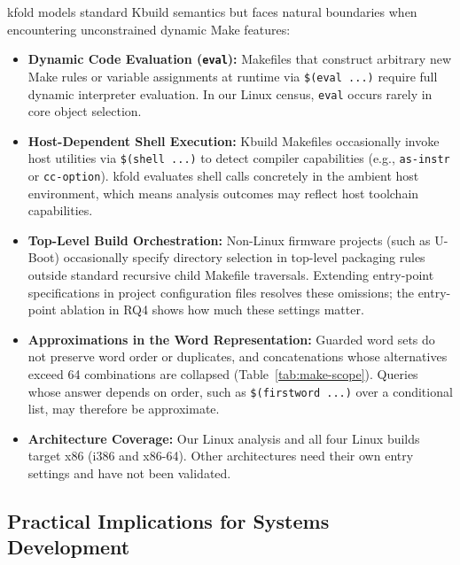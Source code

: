 \documentclass[acmsmall]{acmart}
\newcommand{\tool}{\textsf{kfold}\xspace}
\providecommand{\tightlist}{\setlength{\itemsep}{0pt}\setlength{\parskip}{0pt}}
\begin{document}
\tool models standard Kbuild semantics but faces natural boundaries when encountering unconstrained dynamic Make features:
\begin{itemize}
\tightlist
\item \textbf{Dynamic Code Evaluation (\texttt{eval}):} Makefiles that construct arbitrary new Make rules or variable assignments at runtime via \texttt{\$(eval ...)} require full dynamic interpreter evaluation. In our Linux census, \texttt{eval} occurs rarely in core object selection.
\item \textbf{Host-Dependent Shell Execution:} Kbuild Makefiles occasionally invoke host utilities via \texttt{\$(shell ...)} to detect compiler capabilities (e.g., \texttt{as-instr} or \texttt{cc-option}). \tool evaluates shell calls concretely in the ambient host environment, which means analysis outcomes may reflect host toolchain capabilities.
\item \textbf{Top-Level Build Orchestration:} Non-Linux firmware projects (such as U-Boot) occasionally specify directory selection in top-level packaging rules outside standard recursive child Makefile traversals. Extending entry-point specifications in project configuration files resolves these omissions; the entry-point ablation in RQ4 shows how much these settings matter.
\item \textbf{Approximations in the Word Representation:} Guarded word sets do not preserve word order or duplicates, and concatenations whose alternatives exceed 64 combinations are collapsed (Table~\ref{tab:make-scope}). Queries whose answer depends on order, such as \texttt{\$(firstword ...)} over a conditional list, may therefore be approximate.
\item \textbf{Architecture Coverage:} Our Linux analysis and all four Linux builds target x86 (i386 and x86-64). Other architectures need their own entry settings and have not been validated.
\end{itemize}

\subsection{Practical Implications for Systems Development}\label{sec:discussion:implications}
\end{document}
